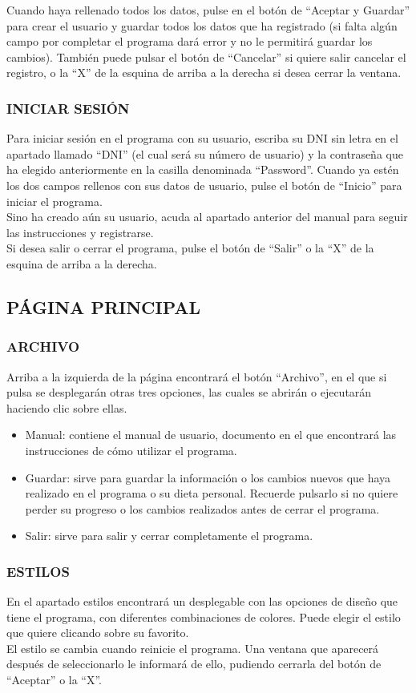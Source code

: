 Cuando haya rellenado todos los datos, pulse en el botón de “Aceptar y Guardar” para crear el usuario y guardar todos los datos que ha registrado (si falta algún campo por completar el programa dará error y no le permitirá guardar los cambios). También puede pulsar el botón de “Cancelar” si quiere salir cancelar el registro, o la “X” de la esquina de arriba a la derecha si desea cerrar la ventana.
\subsubsection{INICIAR SESIÓN}
Para iniciar sesión en el programa con su usuario, escriba su DNI sin letra en el apartado llamado “DNI” (el cual será su número de usuario) y la contraseña que ha elegido anteriormente en la casilla denominada “Password”. Cuando ya estén los dos campos rellenos con sus datos de usuario, pulse el botón de “Inicio” para iniciar el programa.\\
Sino ha creado aún su usuario, acuda al apartado anterior del manual para seguir las instrucciones y registrarse.\\
Si desea salir o cerrar el programa, pulse el botón de “Salir” o la “X” de la esquina de arriba a la derecha.
\subsection{PÁGINA PRINCIPAL}
\subsubsection{ARCHIVO}
Arriba a la izquierda de la página encontrará el botón “Archivo”, en el que si pulsa se desplegarán otras tres opciones, las cuales se abrirán o ejecutarán haciendo clic sobre ellas.
\begin{itemize}
\item	Manual: contiene el manual de usuario, documento en el que encontrará las instrucciones de cómo utilizar el programa.
\item	Guardar: sirve para guardar la información o los cambios nuevos que haya realizado en el programa o su dieta personal. Recuerde pulsarlo si no quiere perder su progreso o los cambios realizados antes de cerrar el programa.
\item	Salir: sirve para salir y cerrar completamente el programa.
\end{itemize}
\subsubsection{ESTILOS}
En el apartado estilos encontrará un desplegable con las opciones de diseño que tiene el programa, con diferentes combinaciones de colores. Puede elegir el estilo que quiere clicando sobre su favorito.\\
El estilo se cambia cuando reinicie el programa. Una ventana que aparecerá después de seleccionarlo le informará de ello, pudiendo cerrarla del botón de “Aceptar” o la “X”.
